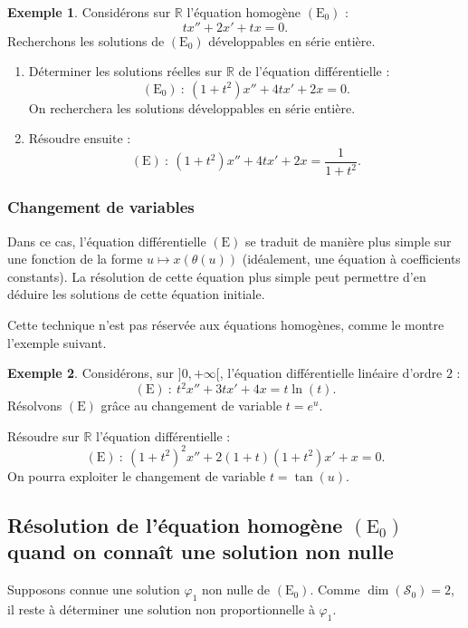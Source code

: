 \documentclass[french]{article}
\newcommand{\R}{\mathbb{R}}
\theoremstyle{plain}
\theoremstyle{definition}
\newtheorem*{ex}{Exemple}
\theoremstyle{remark}
\begin{document}
\begin{ex}
	Considérons sur $\R$ l'équation homogène $(\text{E}_0)$ :
	$$tx''+2x'+tx=0.$$
	Recherchons les solutions de $(\text{E}_0)$ développables en série entière.
\end{ex}

\begin{exo}
	\begin{enumerate}
		\item Déterminer les solutions réelles sur $\R$ de l'équation différentielle :
		$$(\text{E}_0)\ :\ (1+t^2)x''+4tx'+2x=0.$$
		On recherchera les solutions développables en série entière.
		\item Résoudre ensuite :
		$$(\text{E})\ :\ (1+t^2)x''+4tx'+2x=\frac{1}{1+t^2}.$$
	\end{enumerate}
\end{exo}

\subsubsection*{Changement de variables}

Dans ce cas, l'équation différentielle $(\text{E})$ se traduit de manière plus simple sur une fonction de la forme $u\mapsto x(\theta(u))$ (idéalement, une équation à coefficients constants). La résolution de cette équation plus simple peut permettre d'en déduire les solutions de cette équation initiale.

Cette technique n'est pas réservée aux équations homogènes, comme le montre l'exemple suivant.

\begin{ex}
	Considérons, sur $]0,+\infty[$, l'équation différentielle linéaire d'ordre $2$ :
	$$(\text{E})\ :\ t^2x''+3tx'+4x=t\ln(t).$$
	Résolvons $(\text{E})$ grâce au changement de variable $t=e^u$.
\end{ex}

\begin{exo}
	Résoudre sur $\R$ l'équation différentielle :
	$$(\text{E})\ :\ (1+t^2)^2x''+2(1+t)(1+t^2)x'+x=0.$$
	On pourra exploiter le changement de variable $t=\tan(u)$.
\end{exo}

\subsection{Résolution de l'équation homogène $(\text{E}_0)$ quand on connaît une solution non nulle}

Supposons connue une solution $\varphi_1$ non nulle de $(\text{E}_0)$. Comme $\dim(\mathcal{S}_0)=2$, il reste à déterminer une solution non proportionnelle à $\varphi_1$.
\end{document}
